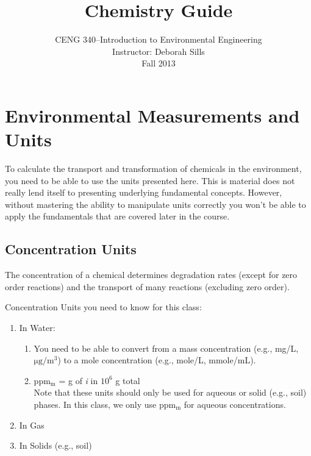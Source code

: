 \documentclass[12pt,letterpaper]{article}
\begin{document}
\setlength{\parindent}{0cm} 


\frenchspacing

\title {Chemistry Guide} 
\author {CENG 340--Introduction to Environmental Engineering\\
Instructor: Deborah Sills\\Fall 2013}
 
\maketitle

\section {Environmental Measurements and Units}
To calculate the transport and transformation of chemicals in the environment, you need to be able to use the units presented here.  This is material does not really lend itself to presenting underlying fundamental concepts.  However, without mastering the ability to manipulate units correctly you won't be able to apply the fundamentals that are covered later in the course.  

\subsection {Concentration Units}
The concentration of a chemical determines degradation rates (except for zero order reactions) and the transport of many reactions (excluding zero order).  

Concentration Units you need to know for this class:

\begin{enumerate}
\item In Water:
\begin{enumerate}
\item You need to be able to convert from a mass concentration (e.g., mg/L, $\mathrm{\mu g/m^3}$) to a mole concentration (e.g., mole/L, mmole/mL).
\item ppm$\mathrm{_m}$ = g of \emph{i} in $10^6$ g total\\

Note that these units should only be used for aqueous or solid (e.g., soil) phases.  In this class, we only use ppm$\mathrm{_m}$ for aqueous concentrations.

\end{enumerate}

\item In Gas

\item In Solids (e.g., soil)

\end{enumerate}
\end{document}
